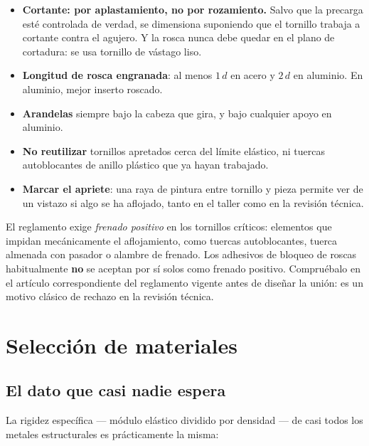 \begin{itemize}
  \item \textbf{Cortante: por aplastamiento, no por rozamiento.} Salvo que la
        precarga esté controlada de verdad, se dimensiona suponiendo que el
        tornillo trabaja a cortante contra el agujero. Y la rosca nunca debe
        quedar en el plano de cortadura: se usa tornillo de vástago liso.
  \item \textbf{Longitud de rosca engranada}: al menos $1\,d$ en acero y
        $2\,d$ en aluminio. En aluminio, mejor inserto roscado.
  \item \textbf{Arandelas} siempre bajo la cabeza que gira, y bajo cualquier
        apoyo en aluminio.
  \item \textbf{No reutilizar} tornillos apretados cerca del límite elástico, ni
        tuercas autoblocantes de anillo plástico que ya hayan trabajado.
  \item \textbf{Marcar el apriete}: una raya de pintura entre tornillo y pieza
        permite ver de un vistazo si algo se ha aflojado, tanto en el taller como
        en la revisión técnica.
\end{itemize}

\begin{regla}
El reglamento exige \emph{frenado positivo} en los tornillos críticos: elementos
que impidan mecánicamente el aflojamiento, como tuercas autoblocantes, tuerca
almenada con pasador o alambre de frenado. Los adhesivos de bloqueo de roscas
habitualmente \textbf{no} se aceptan por sí solos como frenado positivo.
Compruébalo en el artículo correspondiente del reglamento vigente antes de
diseñar la unión: es un motivo clásico de rechazo en la revisión técnica.
\end{regla}

\section{Selección de materiales}
\label{sec:mecanica_aplicada:05}

\subsection{El dato que casi nadie espera}

La rigidez específica --- módulo elástico dividido por densidad --- de casi todos
los metales estructurales es prácticamente la misma:


